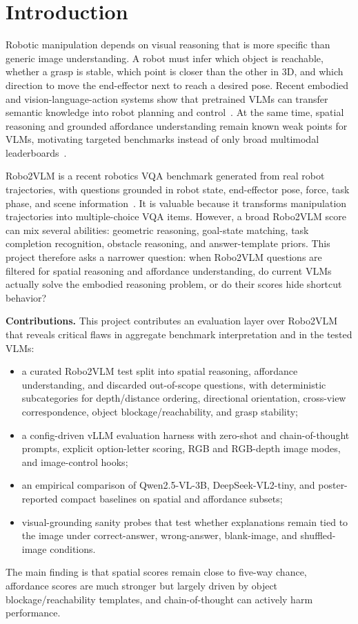 \section{Introduction}
\label{sec:intro}

Robotic manipulation depends on visual reasoning that is more specific than generic image understanding. A robot must infer which object is reachable, whether a grasp is stable, which point is closer than the other in 3D, and which direction to move the end-effector next to reach a desired pose. Recent embodied and vision-language-action systems show that pretrained VLMs can transfer semantic knowledge into robot planning and control~\cite{driess2023palme,brohan2023rt2,oneill2023openx,kim2024openvla}. At the same time, spatial reasoning and grounded affordance understanding remain known weak points for VLMs, motivating targeted benchmarks instead of only broad multimodal leaderboards~\cite{liu2022vsr,chen2024spatialvlm,cheng2024spatialrgpt}.

Robo2VLM is a recent robotics VQA benchmark generated from real robot trajectories, with questions grounded in robot state, end-effector pose, force, task phase, and scene information~\cite{chen2025robo2vlm}. It is valuable because it transforms manipulation trajectories into multiple-choice VQA items. However, a broad Robo2VLM score can mix several abilities: geometric reasoning, goal-state matching, task completion recognition, obstacle reasoning, and answer-template priors. This project therefore asks a narrower question: when Robo2VLM questions are filtered for spatial reasoning and affordance understanding, do current VLMs actually solve the embodied reasoning problem, or do their scores hide shortcut behavior?

\textbf{Contributions.}
This project contributes an evaluation layer over Robo2VLM that reveals critical flaws in aggregate benchmark interpretation and in the tested VLMs:
\begin{itemize}[leftmargin=*,noitemsep,topsep=1pt]
    \item a curated Robo2VLM test split into spatial reasoning, affordance understanding, and discarded out-of-scope questions, with deterministic subcategories for depth/distance ordering, directional orientation, cross-view correspondence, object blockage/reachability, and grasp stability;
    \item a config-driven vLLM evaluation harness with zero-shot and chain-of-thought prompts, explicit option-letter scoring, RGB and RGB-depth image modes, and image-control hooks;
    \item an empirical comparison of Qwen2.5-VL-3B, DeepSeek-VL2-tiny, and poster-reported compact baselines on spatial and affordance subsets;
    \item visual-grounding sanity probes that test whether explanations remain tied to the image under correct-answer, wrong-answer, blank-image, and shuffled-image conditions.
\end{itemize}
The main finding is that spatial scores remain close to five-way chance, affordance scores are much stronger but largely driven by object blockage/reachability templates, and chain-of-thought can actively harm performance.
